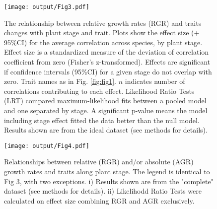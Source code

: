 \documentclass[a4paper,11pt]{article}
\begin{document}
\begin{figure}[h!]
\centering
\texttt{[image: output/Fig3.pdf]}
\caption{The relationship between relative growth rates (RGR) and traits changes with plant stage and trait. Plots show the effect size (+ 95\%CI) for the average correlation across species, by plant stage. Effect size is a standardized measure of the deviation of correlation coefficient from zero (Fisher's z-transformed). Effects are significant if confidence intervals (95\%CI) for a given stage do not overlap with zero. Trait names as in Fig. \ref{fig:fig1}. $n$ indicates number of correlations contributing to each effect. Likelihood Ratio Tests (LRT) compared maximum-likelihood fits between a pooled model and one separated by stage. A significant p-value means the model including stage effect fitted the data better than the null model. Results shown are from the ideal dataset (see methods for details).}
\label{fig:fig3}
\end{figure}

\begin{figure}[h!]
\centering
\texttt{[image: output/Fig4.pdf]}
\caption{Relationships between relative (RGR) and/or absolute (AGR) growth rates and traits along plant stage. The legend is identical to Fig 3, with two exceptions. i) Results shown are from the "complete" dataset (see methods for details). ii) Likelihodd Ratio Tests were calculated on effect size combining RGR and AGR exclusively.}
\label{fig:fig4}
\end{figure}


\clearpage
\end{document}
